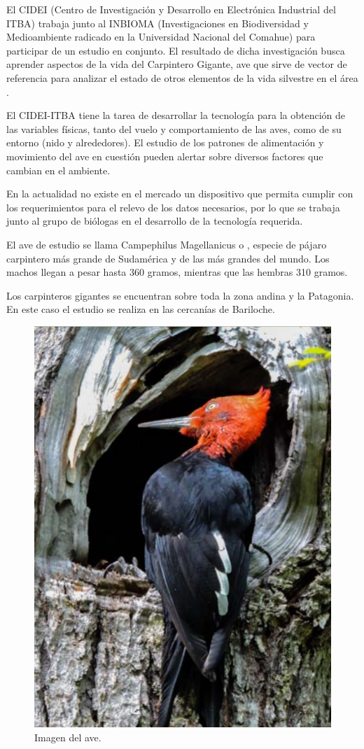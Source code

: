 El CIDEI (Centro de Investigación y Desarrollo en Electrónica Industrial del ITBA) trabaja junto al INBIOMA (Investigaciones en Biodiversidad y Medioambiente radicado en la Universidad Nacional del Comahue) para participar de un estudio en conjunto. El resultado de dicha investigación busca aprender aspectos de la vida del Carpintero Gigante, ave que sirve de vector de referencia para analizar el estado de otros elementos de la vida silvestre en el área \cite{ref:PaperValeriaOjeda}.

El CIDEI-ITBA tiene la tarea de desarrollar la tecnología para la obtención de las variables físicas, tanto del vuelo y comportamiento de las aves, como de su entorno (nido y alrededores). El estudio de los patrones de alimentación y movimiento del ave en cuestión pueden alertar sobre diversos factores que cambian en el ambiente.

En la actualidad no existe en el mercado un dispositivo que permita cumplir con los requerimientos para el relevo de los datos necesarios, por lo que se trabaja junto al grupo de biólogas en el desarrollo de la tecnología requerida.

El ave de estudio se llama Campephilus Magellanicus o , especie de pájaro carpintero más grande de Sudamérica y de las más grandes del mundo. Los machos llegan a pesar hasta 360 gramos, mientras que las hembras 310 gramos.

Los carpinteros gigantes se encuentran sobre toda la zona andina y la Patagonia. En este caso el estudio se realiza en las cercanías de Bariloche. 
\begin{figure}[H]
	\centering
	\includegraphics[width=0.4\linewidth]{ImagenesIntroduccion/pajaro}
	\caption{Imagen del ave.}
	\label{fig:pajaro}
\end{figure}

